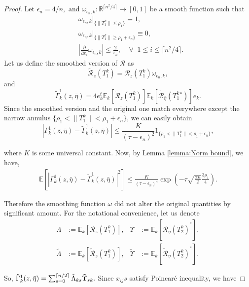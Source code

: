 \documentclass[10pt,a4paper]{amsart}
\newcommand{\conjugate}{{\operatorname{^*}}}
\begin{document}
\begin{proof}

Let $\epsilon_n= 4/n, \text{ and } \omega_{\epsilon_n,k}:\mathbb{R}^{\lceil n^2/4 \rceil} \rightarrow [0,1]$ be a smooth function such that 
\begin{align*}
&\omega_{\epsilon_n,k}|_{\{\|T_1^k\|\leq \rho_1\}} \equiv 1, \\
&\omega_{\epsilon_n,k}|_{\{\|T_1^k\|\geq \rho_1+\epsilon_n\}} \equiv 0,\\
&\left|\frac{\partial}{\partial x_{i}}\omega_{\epsilon_n,k}\right| \leq \frac{2}{\epsilon_n}, \;\;\;\; \forall \;\; 1\leq i \leq \lceil n^{2}/4\rceil.
\end{align*}
Let us define the smoothed version of $\mathcal{R}$ as $$\tilde{\mathcal{R}}_z(T_1^k)=\mathcal{R}_{z}(T_1^k)\omega_{\epsilon_n,k},$$
and
$$
\tilde{\Gamma}_{k}^1(z,\bar{\eta}) =4e_k^t \mathbb{E}_k [\tilde{\mathcal{R}}_z(T_1^k)]\mathbb{E}_k [\tilde{\mathcal{R}}_{\bar{\eta}}(T_1^k\conjugate)]e_k.
$$
Since the smoothed version and the original one match everywhere except the narrow annulus $\{\rho_1<\|T_1^k\|<\rho_1+\epsilon_n\}$, we can easily obtain
$$
|\Gamma_{k}^1(z,\bar{\eta})-\tilde{\Gamma}_{k}^1(z,\bar{\eta})| \leq\frac{K}{(\tau - \epsilon_n)^2}1_{\{\rho_1<\|T_1^k\|<\rho_1+\epsilon_n\}},
$$

where $K$ is some universal constant. Now, by Lemma \ref{lemma:Norm bound}, we have, 
\begin{align}
    \mathbb{E}[|\Gamma_{k}^1(z,\bar{\eta})-\tilde\Gamma_{k}^1(z,\bar{\eta})|^2] \leq \frac{K}{(\tau - \epsilon_n)^4}  \exp{\left(-\tau \sqrt{\frac{\alpha n}{2}}\frac{3\rho_1}{4}\right)}.\label{eqn: diff between Gamma and tilde Gamma}
\end{align}

Therefore the smoothing function $\omega$ did not alter the original quantities by significant amount. For the notational convenience, let us denote
\begin{align*}
    \Lambda &:= \mathbb{E}_k[\mathcal{R}_{z}(T_1^k)], & \Upsilon &:= \mathbb{E}_k[\mathcal{R}_{\eta}(T_2^k)^\conjugate],\\
    \tilde{\Lambda} &:= \mathbb{E}_k[\tilde{\mathcal{R}}_z(T_1^k)], &\tilde{\Upsilon} &:= \mathbb{E}_k[\tilde{\mathcal{R}}_\eta(T_2^k)^\conjugate].
\end{align*}

So, $\tilde{\Gamma}_{k}^1(z,\bar{\eta}) = \sum_{s=0}^{\lceil n/2 \rceil} \Tilde{\Lambda}_{ks}\Tilde{\Upsilon}_{sk}.$ Since $x_{ij}s$ satisfy Poincar\'e inequality, we have


\end{proof}
\end{document}

